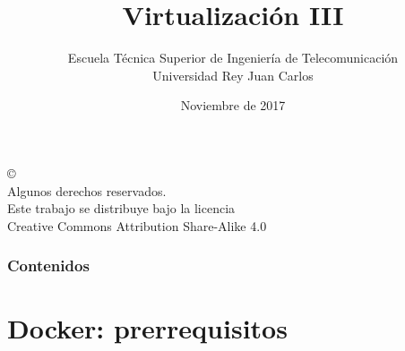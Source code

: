 \documentclass[ucs]{beamer}
\begin{document}
\title[Virtualización III]{Virtualización III}

\author[GSyC]{Escuela Técnica Superior de Ingeniería de Telecomunicación\\
Universidad Rey Juan Carlos}
\date[2017]{Noviembre de 2017}



\begin{frame}
  \titlepage
\end{frame}



\begin{frame}[b]
\begin{flushright}
{\tiny
\copyright \insertshortdate~\insertshortauthor \\
  Algunos derechos reservados. \\
  Este trabajo se distribuye bajo la licencia \\
  Creative Commons Attribution Share-Alike 4.0\\
}
\end{flushright}  
\end{frame}



\begin{frame}
  \frametitle{Contenidos}

  \tableofcontents

\end{frame}


\section{Docker: prerrequisitos}
\end{document}
